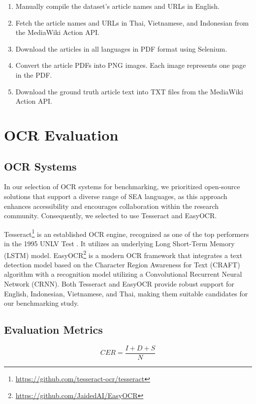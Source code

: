 \documentclass[12pt,oneside]{memoir}
\begin{document}
\begin{enumerate}
    \item Manually compile the dataset’s article names and URLs in English.
    \item Fetch the article names and URLs in Thai, Vietnamese, and Indonesian from the MediaWiki Action API.
    \item Download the articles in all languages in PDF format using Selenium.
    \item Convert the article PDFs into PNG images. Each image represents one page in the PDF.
    \item Download the ground truth article text into TXT files from the MediaWiki Action API.
\end{enumerate}

\section{OCR Evaluation}

\subsection{OCR Systems}
In our selection of OCR systems for benchmarking, we prioritized open-source 
solutions that support a diverse range of SEA languages, as this approach 
enhances accessibility and encourages collaboration within the research community. 
Consequently, we selected to use Tesseract and EasyOCR. 

Tesseract\footnote{\url{https://github.com/tesseract-ocr/tesseract}} is an established OCR engine, recognized as one of the top performers 
in the 1995 UNLV Test \parencite{rice-etal-1995}. It utilizes an underlying Long Short-Term Memory (LSTM) 
model. EasyOCR\footnote{\url{https://github.com/JaidedAI/EasyOCR}} is a modern OCR framework that integrates a text detection model 
based on the Character Region Awareness for Text (CRAFT) algorithm with a 
recognition model utilizing a Convolutional Recurrent Neural Network (CRNN). Both 
Tesseract and EasyOCR provide robust support for English, Indonesian, Vietnamese, 
and Thai, making them suitable candidates for our benchmarking study.

\subsection{Evaluation Metrics}

\begin{equation}
    CER = \frac{I + D + S}{N}
    \label{equation:cer}
\end{equation}
\end{document}
